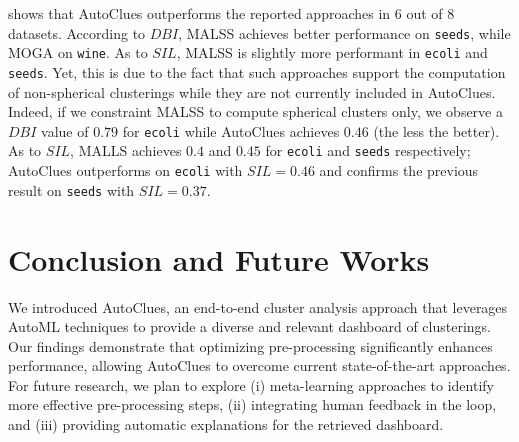  shows that AutoClues outperforms the reported approaches in 6 out of 8 datasets.
According to $DBI$, MALSS achieves better performance on \texttt{seeds}, while MOGA on \texttt{wine}.
As to $SIL$, MALSS is slightly more performant in \texttt{ecoli} and \texttt{seeds}.
Yet, this is due to the fact that such approaches support the computation of non-spherical clusterings while they are not currently included in AutoClues.
Indeed, if we constraint MALSS to compute spherical clusters only, we observe a $DBI$ value of $0.79$ for \texttt{ecoli} while AutoClues achieves $0.46$ (the less the better).
As to $SIL$, MALLS achieves $0.4$ and $0.45$ for \texttt{ecoli} and \texttt{seeds} respectively; AutoClues outperforms on \texttt{ecoli} with $SIL=0.46$ and confirms the previous result on \texttt{seeds} with $SIL=0.37$.


\section{Conclusion and Future Works}\label{clustering-sec:conclusion}
We introduced AutoClues, an end-to-end cluster analysis approach that leverages AutoML techniques to provide a diverse and relevant dashboard of clusterings.
Our findings demonstrate that optimizing pre-processing significantly enhances performance, allowing AutoClues to overcome current state-of-the-art approaches. For future research, we plan to explore (i) meta-learning approaches to identify more effective pre-processing steps, (ii) integrating human feedback in the loop, and (iii) providing automatic explanations for the retrieved dashboard.


